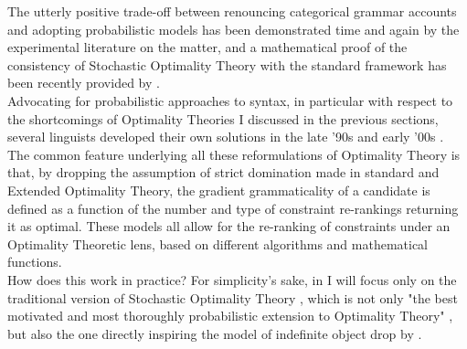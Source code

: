 The utterly positive trade-off between renouncing categorical grammar accounts and adopting probabilistic models has been demonstrated time and again by the experimental literature on the matter, and a mathematical proof of the consistency of Stochastic Optimality Theory with the standard framework has been recently provided by \textcite{magri2018implicational}. \\
Advocating for probabilistic approaches to syntax, in particular with respect to the shortcomings of Optimality Theories I discussed in the previous sections, several linguists developed their own solutions in the late '90s and early '00s \parencite{Boersma2004, SoraceKeller2005, Keller2000, Keller2006, AlexopoulouKeller2006, BoersmaHayes2001empirical, keller1998gradient, davidson2003tense}. The common feature underlying all these reformulations of Optimality Theory is that, by dropping the assumption of strict domination made in standard and Extended Optimality Theory, the gradient grammaticality of a candidate is defined as a function of the number and type of constraint re-rankings returning it as optimal. These models all allow for the re-ranking of constraints under an Optimality Theoretic lens, based on different algorithms and mathematical functions.\\
How does this work in practice? For simplicity's sake, in  I will focus only on the traditional version of Stochastic Optimality Theory \parencite{boersma1997we, BoersmaHayes2001empirical}, which is not only "the best motivated and most thoroughly probabilistic extension to Optimality Theory" \parencite[25]{manning2003probabilistic}, but also the one directly inspiring the model of indefinite object drop by \textcite{Medina2007}.


